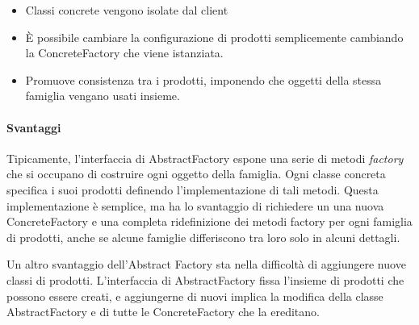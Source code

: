 \begin{itemize}
  \item Classi concrete vengono isolate dal client
  \item È possibile cambiare la configurazione di prodotti semplicemente
    cambiando la ConcreteFactory che viene istanziata.
  \item Promuove consistenza tra i prodotti, imponendo che oggetti della stessa
    famiglia vengano usati insieme.
\end{itemize}

\paragraph{ Svantaggi }

Tipicamente, l'interfaccia di AbstractFactory espone una serie di metodi
\emph{factory} che si occupano di costruire ogni oggetto della famiglia. Ogni
classe concreta specifica i suoi prodotti definendo l'implementazione di tali
metodi. Questa implementazione è semplice, ma ha lo svantaggio di richiedere un
una nuova ConcreteFactory e una completa ridefinizione dei metodi factory per
ogni famiglia di prodotti, anche se alcune famiglie differiscono tra loro solo
in alcuni dettagli.

Un altro svantaggio dell'Abstract Factory sta nella difficoltà di aggiungere
nuove classi di prodotti. L'interfaccia di AbstractFactory fissa l'insieme di
prodotti che possono essere creati, e aggiungerne di nuovi implica la modifica
della classe AbstractFactory e di tutte le ConcreteFactory che la ereditano.
